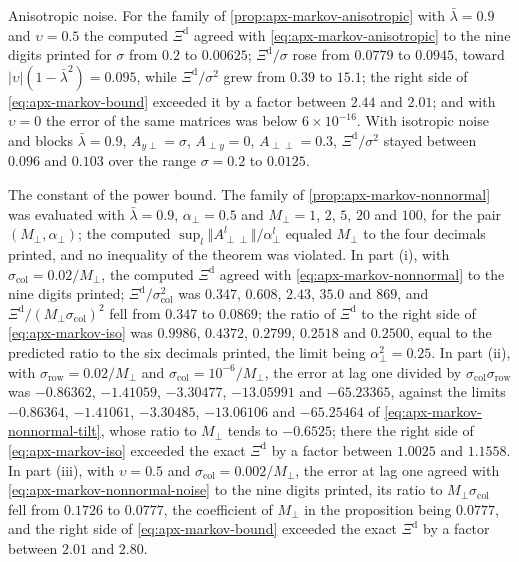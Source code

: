 \begin{numcheck}
Anisotropic noise. For the family of \cref{prop:apx-markov-anisotropic} with $\bar\lambda=0.9$ and $\upsilon=0.5$ the computed $\Xi^{\mathrm d}$ agreed with \eqref{eq:apx-markov-anisotropic} to the nine digits printed for $\sigma$ from $0.2$ to $0.00625$; $\Xi^{\mathrm d}/\sigma$ rose from $0.0779$ to $0.0945$, toward $\lvert\upsilon\rvert(1-\bar\lambda^2)=0.095$, while $\Xi^{\mathrm d}/\sigma^2$ grew from $0.39$ to $15.1$; the right side of \eqref{eq:apx-markov-bound} exceeded it by a factor between $2.44$ and $2.01$; and with $\upsilon=0$ the error of the same matrices was below $6\times10^{-16}$. With isotropic noise and blocks $\bar\lambda=0.9$, $A_{y\perp}=\sigma$, $A_{\perp y}=0$, $A_{\perp\perp}=0.3$, $\Xi^{\mathrm d}/\sigma^2$ stayed between $0.096$ and $0.103$ over the range $\sigma=0.2$ to $0.0125$.

The constant of the power bound. The family of \cref{prop:apx-markov-nonnormal} was evaluated with $\bar\lambda=0.9$, $\alpha_\perp=0.5$ and $M_\perp=1$, $2$, $5$, $20$ and $100$, for the pair $(M_\perp,\alpha_\perp)$; the computed $\sup_l\Vert A_{\perp\perp}^l\Vert/\alpha_\perp^l$ equaled $M_\perp$ to the four decimals printed, and no inequality of the theorem was violated. In part (i), with $\sigma_{\mathrm{col}}=0.02/M_\perp$, the computed $\Xi^{\mathrm d}$ agreed with \eqref{eq:apx-markov-nonnormal} to the nine digits printed; $\Xi^{\mathrm d}/\sigma_{\mathrm{col}}^2$ was $0.347$, $0.608$, $2.43$, $35.0$ and $869$, and $\Xi^{\mathrm d}/(M_\perp\sigma_{\mathrm{col}})^2$ fell from $0.347$ to $0.0869$; the ratio of $\Xi^{\mathrm d}$ to the right side of \eqref{eq:apx-markov-iso} was $0.9986$, $0.4372$, $0.2799$, $0.2518$ and $0.2500$, equal to the predicted ratio to the six decimals printed, the limit being $\alpha_\perp^2=0.25$. In part (ii), with $\sigma_{\mathrm{row}}=0.02/M_\perp$ and $\sigma_{\mathrm{col}}=10^{-6}/M_\perp$, the error at lag one divided by $\sigma_{\mathrm{col}}\sigma_{\mathrm{row}}$ was $-0.86362$, $-1.41059$, $-3.30477$, $-13.05991$ and $-65.23365$, against the limits $-0.86364$, $-1.41061$, $-3.30485$, $-13.06106$ and $-65.25464$ of \eqref{eq:apx-markov-nonnormal-tilt}, whose ratio to $M_\perp$ tends to $-0.6525$; there the right side of \eqref{eq:apx-markov-iso} exceeded the exact $\Xi^{\mathrm d}$ by a factor between $1.0025$ and $1.1558$. In part (iii), with $\upsilon=0.5$ and $\sigma_{\mathrm{col}}=0.002/M_\perp$, the error at lag one agreed with \eqref{eq:apx-markov-nonnormal-noise} to the nine digits printed, its ratio to $M_\perp\sigma_{\mathrm{col}}$ fell from $0.1726$ to $0.0777$, the coefficient of $M_\perp$ in the proposition being $0.0777$, and the right side of \eqref{eq:apx-markov-bound} exceeded the exact $\Xi^{\mathrm d}$ by a factor between $2.01$ and $2.80$.


\end{numcheck}
